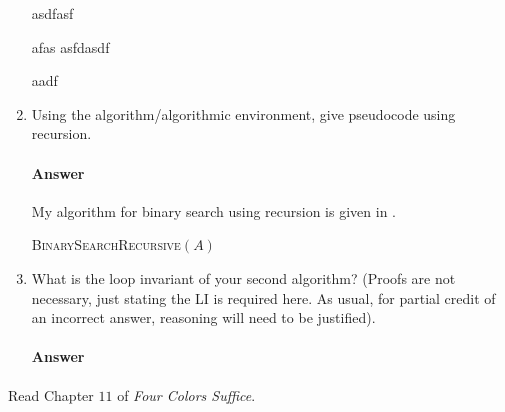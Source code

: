 \documentclass{article}
\begin{document}
\begin{enumerate}
\begin{algorithm}
\begin{algorithmic}
                asdfasf
                
                
                \State afas
                asfdasdf
                
                aadf
            \end{algorithmic}
        \end{algorithm}

    \item Using the algorithm/algorithmic environment, give pseudocode using
        recursion.

        \paragraph{Answer} My algorithm for binary search using recursion is given in .

         \begin{algorithm}
            \caption{\textsc{BinarySearchRecursive}$(A)$}\label{alg:recursive}
            \begin{algorithmic}
                \State {}
            \end{algorithmic}
        \end{algorithm}

    \item What is the loop invariant of your second algorithm? (Proofs are not
        necessary, just stating the LI is required here.  As usual, for partial
        credit of an incorrect answer, reasoning will need to be justified).

        \paragraph{Answer}

\end{enumerate}

 

Read Chapter $11$ of \emph{Four Colors Suffice}.
\end{document}
